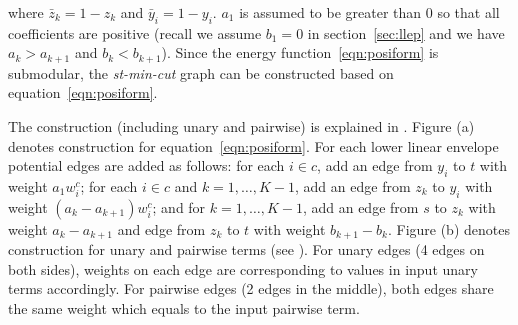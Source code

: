 \noindent where $\bar{z}_k = 1 - z_k$ and $\bar{y}_i = 1 - y_i$.
$a_1$ is assumed to be greater than $0$ so that all coefficients
are positive (recall we assume $b_1=0$ in section~\ref{sec:llep}
and we have $a_k > a_{k+1}$ and $b_k < b_{k+1}$). Since the energy function~\eqref{eqn:posiform}
is submodular, the \emph{st-min-cut} graph can be constructed 
based on equation~\eqref{eqn:posiform}.

The construction (including unary and pairwise) is explained in
. Figure (a) denotes construction for
equation~\eqref{eqn:posiform}. For each lower linear envelope
potential edges are added as follows: for each $i \in c$, add an
edge from $y_i$ to $t$ with weight $a_1 w^c_i$; for each $i \in
c$ and $k = 1, \ldots, K-1$, add an edge from $z_k$ to $y_i$ with
weight $(a_{k} - a_{k+1}) w^c_i$; and for $k = 1, \ldots, K-1$,
add an edge from $s$ to $z_k$ with weight $a_k - a_{k+1}$ and
edge from $z_k$ to $t$ with weight $b_{k+1} - b_k$. Figure (b)
denotes construction for unary and pairwise terms (see
\cite{Kolmogorov:PAMI04}). For unary edges (4 edges on both
sides), weights on each edge are corresponding to values in input
unary terms accordingly. For pairwise edges (2 edges in the
middle), both edges share the same weight which equals to the
input pairwise term.


